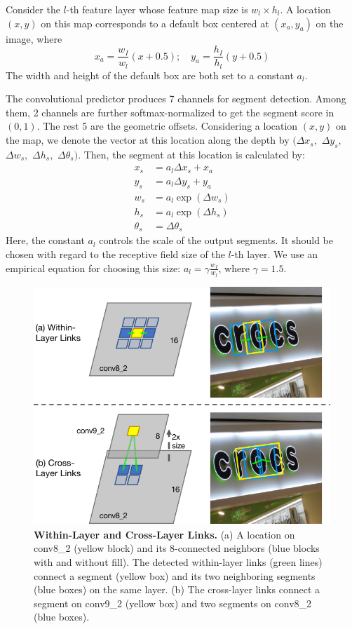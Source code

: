 \documentclass[10pt,twocolumn,letterpaper]{article}
\begin{document}
Consider the $l$-th feature layer whose feature map size is $w_l \times h_l$.
A location $(x, y)$ on this map corresponds to a default box centered at $(x_{a}, y_{a})$ on the image, where
\begin{equation}
  x_{a} = \frac{w_I}{w_l}(x+0.5);\quad y_{a} = \frac{h_I}{h_l}(y+0.5)
\end{equation}
The width and height of the default box are both set to a constant $a_l$.

The convolutional predictor produces 7 channels for segment detection.
Among them, 2 channels are further softmax-normalized to get the segment score in $(0,1)$.
The rest 5 are the geometric offsets.
Considering a location $(x,y)$ on the map, we denote the vector at this location along the depth by $(\Delta x_{s},$ $\Delta y_{s},$ $\Delta w_{s},$ $\Delta h_{s},$ $\Delta \theta_{s})$.
Then, the segment at this location is calculated by:
\begin{align}
  x_{s} &= a_l \Delta x_{s} + x_{a} \label{eq:calc-segment-first} \\
  y_{s} &= a_l \Delta y_{s} + y_{a} \\
  w_{s} &= a_l \exp(\Delta w_{s}) \\
  h_{s} &= a_l \exp(\Delta h_{s}) \\
  \theta_{s} &= \Delta \theta_{s} \label{eq:calc-segment-last}
\end{align}
Here, the constant $a_l$ controls the scale of the output segments.
It should be chosen with regard to the receptive field size of the $l$-th layer.
We use an empirical equation for choosing this size: $a_l = \gamma \frac{w_{I}}{w_l}$, where $\gamma=1.5$.

\begin{figure}
  \centering
  \includegraphics[width=0.85\linewidth]{figures/links.pdf}
  \caption{\textbf{Within-Layer and Cross-Layer Links.} (a) A location on conv8\_2 (yellow block) and its 8-connected neighbors (blue blocks with and without fill). The detected within-layer links (green lines) connect a segment (yellow box) and its two neighboring segments (blue boxes) on the same layer.
  (b) The cross-layer links connect a segment on conv9\_2 (yellow box) and two segments on conv8\_2 (blue boxes).}
  \label{fig:links}
\end{figure}
\end{document}
